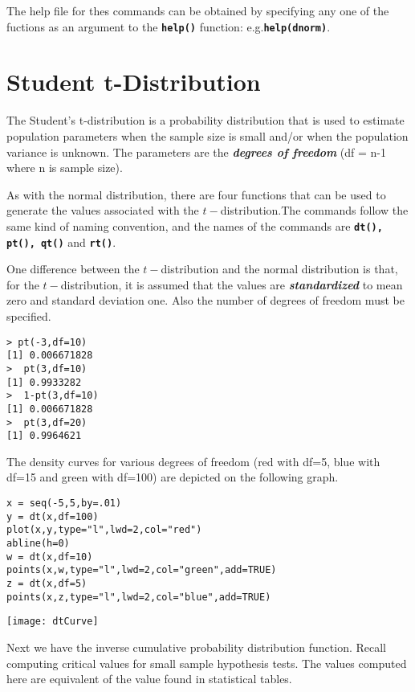 \documentclass[a4paper,12pt]{article}
\begin{document}
The help file for thes commands can be obtained by specifying any one of the fuctions as an argument to the \textbf{\texttt{help()}} function: e.g.\textbf{\texttt{help(dnorm)}}.

\section{Student t-Distribution}
The Student’s t-distribution is a probability distribution that is used to estimate population parameters when the sample size is small and/or when the population variance is unknown.
The parameters are the \textbf{\textit{degrees of freedom}} (df = n-1 where n is sample size).

As with the normal distribution, there are four functions that can be used to generate the values associated with the $t-$distribution.The commands follow the same kind of naming convention, and the names of the commands are \texttt{\textbf{dt(), pt(), qt()}} and \texttt{\textbf{rt()}}.

One difference between the $t-$distribution and the normal distribution is that, for the $t-$distribution, it is assumed that the values are \textit{\textbf{standardized }}to mean zero and standard deviation one.
Also the number of degrees of freedom must be specified. 

\begin{verbatim}
> pt(-3,df=10)
[1] 0.006671828
>  pt(3,df=10)
[1] 0.9933282
>  1-pt(3,df=10)
[1] 0.006671828
>  pt(3,df=20)
[1] 0.9964621
\end{verbatim}
The density curves for various degrees of freedom (red with df=5, blue with df=15 and green with df=100) are depicted on the following graph.

\begin{verbatim}
x = seq(-5,5,by=.01)
y = dt(x,df=100) 
plot(x,y,type="l",lwd=2,col="red")
abline(h=0)
w = dt(x,df=10) 
points(x,w,type="l",lwd=2,col="green",add=TRUE)
z = dt(x,df=5) 
points(x,z,type="l",lwd=2,col="blue",add=TRUE)
\end{verbatim}

 \begin{center}
 \texttt{[image: dtCurve]}
 \end{center}
Next we have the inverse cumulative probability distribution function. Recall computing critical values for small sample hypothesis tests. The values computed here are equivalent of the value found in statistical tables.
\end{document}
